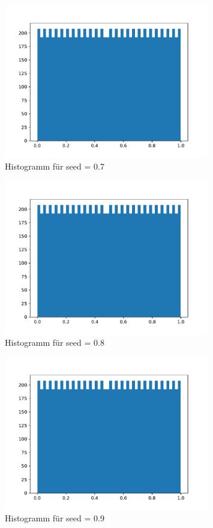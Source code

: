 \begin{figure}[H]
  \centering
  \includegraphics[width=0.8\textwidth]{nr8_c_seed=0.7.pdf}
  \caption{Histogramm für seed = 0.7}
\end{figure}

\begin{figure}[H]
  \centering
  \includegraphics[width=0.8\textwidth]{nr8_c_seed=0.8.pdf}
  \caption{Histogramm für seed = 0.8}
\end{figure}

\begin{figure}[H]
  \centering
  \includegraphics[width=0.8\textwidth]{nr8_c_seed=0.9.pdf}
  \caption{Histogramm für seed = 0.9}
\end{figure}


